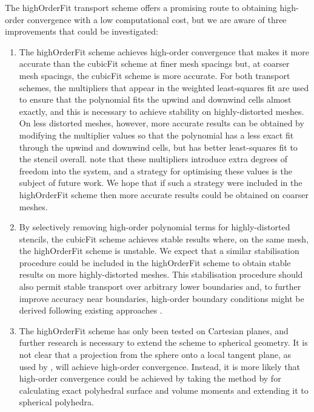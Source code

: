 The highOrderFit transport scheme offers a promising route to obtaining high-order convergence with a low computational cost, but we are aware of three improvements that could be investigated:
\begin{enumerate}
\item The highOrderFit scheme achieves high-order convergence that makes it more accurate than the cubicFit scheme at finer mesh spacings but, at coarser mesh spacings, the cubicFit scheme is more accurate.
For both transport schemes, the multipliers that appear in the weighted least-squares fit are used to ensure that the polynomial fits the upwind and downwind cells almost exactly, and this is necessary to achieve stability on highly-distorted meshes.
On less distorted meshes, however, more accurate results can be obtained by modifying the multiplier values so that the polynomial has a less exact fit through the upwind and downwind cells, but has better least-squares fit to the stencil overall.
\citet{devendran2017} note that these multipliers introduce extra degrees of freedom into the system, and a strategy for optimising these values is the subject of future work.
We hope that if such a strategy were included in the highOrderFit scheme then more accurate results could be obtained on coarser meshes.
%
\item By selectively removing high-order polynomial terms for highly-distorted stencils, the cubicFit scheme achieves stable results where, on the same mesh, the highOrderFit scheme is unstable.
We expect that a similar stabilisation procedure could be included in the highOrderFit scheme to obtain stable results on more highly-distorted meshes.
This stabilisation procedure should also permit stable transport over arbitrary lower boundaries and, to further improve accuracy near boundaries, high-order boundary conditions might be derived following existing approaches \citep{devendran2017,schwartz2015}.
%
\item The highOrderFit scheme has only been tested on Cartesian planes, and further research is necessary to extend the scheme to spherical geometry.
It is not clear that a projection from the sphere onto a local tangent plane, as used by \citet{sjoegreen2012}, will achieve high-order convergence.
Instead, it is more likely that high-order convergence could be achieved by taking the method by \citet{tuzikov2003} for calculating exact polyhedral surface and volume moments and extending it to spherical polyhedra.
\end{enumerate}

